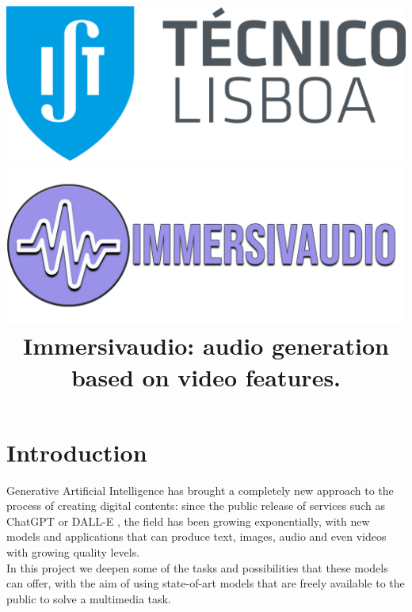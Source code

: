 \documentclass[conference]{IEEEtran}
\begin{document}
\title{\includegraphics[scale=0.4]{IST.png} \\ \vspace{30px} \includegraphics[scale=0.06]{../Immersivaudio logo.png} \\Immersivaudio: audio generation based on video features.}

\author{
\and
{}
\and
{}
}

\maketitle
 
\section{Introduction}
Generative Artificial Intelligence has brought a completely new approach to the process of creating digital contents: since the public release of services such as ChatGPT \cite{chatgptintro} or DALL-E \cite{dall-e}, the field has been growing exponentially, with new models and applications that can produce text, images, audio and even videos with growing quality levels.
\\In this project we deepen some of the tasks and possibilities that these models can offer, with the aim of using state-of-art models that are freely available to the public to solve a multimedia task.
\end{document}
